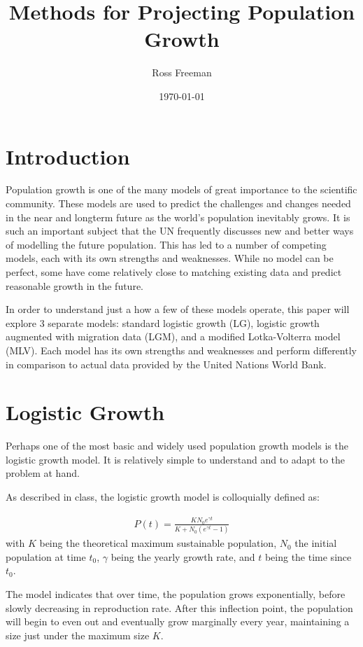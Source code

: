 \documentclass[a4paper]{article}
\begin{document}
\title{Methods for Projecting Population Growth}
\author{Ross Freeman}
\date{\today}
\maketitle
\section{Introduction}

Population growth is one of the many models of great importance to the scientific community. These models are used to predict the challenges and changes needed in the near and longterm future as the world's population inevitably grows. It is such an important subject that the UN frequently discusses new and better ways of modelling the future population. This has led to a number of competing models, each with its own strengths and weaknesses. While no model can be perfect, some have come relatively close to matching existing data and predict reasonable growth in the future. 

In order to understand just a how a few of these models operate, this paper will explore 3 separate models: standard logistic growth (LG), logistic growth augmented with migration data (LGM), and a modified Lotka-Volterra model (MLV). Each model has its own strengths and weaknesses and perform differently in comparison to actual data provided by the United Nations World Bank.

\section{Logistic Growth}

Perhaps one of the most basic and widely used population growth models is the logistic growth model. It is relatively simple to understand and to adapt to the problem at hand.

As described in class, the logistic growth model is colloquially defined as:

\begin{align}
\label{eq:log-growth}
	P(t) = \frac{K N_0 e^{\gamma t}}{K + N_0 (e^{\gamma t} - 1)}
\end{align}
with $K$ being the theoretical maximum sustainable population, $N_0$ the initial population at time $t_0$, $\gamma$ being the yearly growth rate, and $t$ being the time since $t_0$.

The model indicates that over time, the population grows exponentially, before slowly decreasing in reproduction rate. After this inflection point, the population will begin to even out and eventually grow marginally every year, maintaining a size just under the maximum size $K$. 
\end{document}
